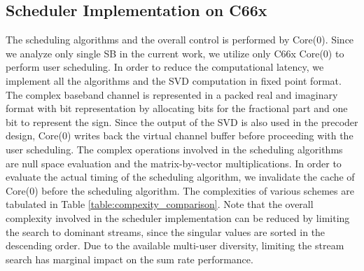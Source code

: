 \documentclass[conference,letterpaper,9pt]{./../IEEEtran}
\begin{document}
\subsection{Scheduler Implementation on C66x}
The scheduling algorithms and the overall control is performed by Core(0). Since we analyze only single SB in the current work, we utilize only C66x Core(0) to perform user scheduling. In order to reduce the computational latency, we implement all the algorithms and the SVD computation in fixed point format. The complex baseband channel is represented in a packed real and imaginary format with  bit representation by allocating  bits for the fractional part and one bit to represent the sign. Since the output of the SVD is also used in the precoder design, Core(0) writes back the virtual channel buffer before proceeding with the user scheduling. The complex operations involved in the scheduling algorithms are null space evaluation and the matrix-by-vector multiplications. In order to evaluate the actual timing of the scheduling algorithm, we invalidate the cache of Core(0) before the scheduling algorithm. The complexities of various schemes are tabulated in Table \ref{table:compexity_comparison}. Note that the overall complexity involved in the scheduler implementation can be reduced by limiting the search to dominant streams, since the singular values are sorted in the descending order. Due to the available multi-user diversity, limiting the stream search has marginal impact on the sum rate performance. 
\end{document}
